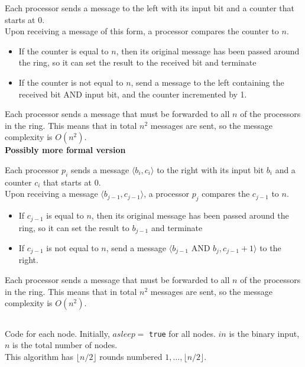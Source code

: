 \documentclass[11pt]{article}
\begin{document}
Each processor sends a message to the left with its input bit and a counter that starts at 0.\\
Upon receiving a message of this form, a processor compares the counter to $n$.\\
\begin{itemize}
\item If the counter is equal to $n$, then its original message has been passed around the ring, so it can set the result to the received bit and terminate
\item If the counter is not equal to $n$, send a message to the left containing the received bit AND input bit, and the counter incremented by 1.
\end{itemize}
Each processor sends a message that must be forwarded to all $n$ of the processors in the ring. This means that in total $n^2$ messages are sent, so the message complexity is $O(n^2)$.\\

\textbf{Possibly more formal version}

Each processor $p_i$ sends a message $\langle b_i, c_i \rangle$ to the right with its input bit $b_i$ and a counter $c_i$ that starts at 0.\\
Upon receiving a message $\langle b_{j-1}, c_{j-1} \rangle$, a processor $p_j$ compares the $c_{j-1}$ to $n$.\\
\begin{itemize}
\item If $c_{j-1}$ is equal to $n$, then its original message has been passed around the ring, so it can set the result to $b_{j-1}$ and terminate
\item If $c_{j-1}$ is not equal to $n$, send a message $\langle b_{j-1} \text{ AND } b_j, c_{j-1} + 1 \rangle$ to the right.
\end{itemize}
Each processor sends a message that must be forwarded to all $n$ of the processors in the ring. This means that in total $n^2$ messages are sent, so the message complexity is $O(n^2)$.


\subsection{}

Code for each node. Initially, $asleep =$ \texttt{true} for all nodes. $in$ is the binary input, $n$ is the total number of nodes.\\
This algorithm has $\lfloor n/2 \rfloor$ rounds numbered $1,\dots,\lfloor n/2 \rfloor$.
\end{document}
